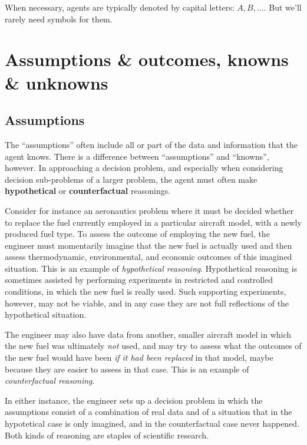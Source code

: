 \documentclass[
  a4paper,
  DIV=11,
  numbers=noendperiod,
  oneside]{scrreprt}
\begin{document}
When necessary, agents are typically denoted by capital letters:
{\(A, B,\dotsc\).} But we'll rarely need symbols for them.

\hypertarget{assumptions-outcomes-knowns-unknowns}{%
\section{Assumptions \& outcomes, knowns \&
unknowns}\label{assumptions-outcomes-knowns-unknowns}}

\hypertarget{assumptions}{%
\subsection{Assumptions}\label{assumptions}}

The ``assumptions'' often include all or part of the data and
information that the agent knows. There is a difference between
``assumptions'' and ``knowns'', however. In approaching a decision
problem, and especially when considering decision sub-problems of a
larger problem, the agent must often make \textbf{hypothetical} or
\textbf{counterfactual} reasonings.

Consider for instance an aeronautics problem where it must be decided
whether to replace the fuel currently employed in a particular aircraft
model, with a newly produced fuel type. To assess the outcome of
employing the new fuel, the engineer must momentarily imagine that the
new fuel is actually used and then assess thermodynamic, environmental,
and economic outcomes of this imagined situation. This is an example of
\emph{hypothetical reasoning}. Hypothetical reasoning is sometimes
assisted by performing experiments in restricted and controlled
conditions, in which the new fuel is really used. Such supporting
experiments, however, may not be viable, and in any case they are not
full reflections of the hypothetical situation.

The engineer may also have data from another, smaller aircraft model in
which the new fuel was ultimately \emph{not} used, and may try to assess
what the outcomes of the new fuel would have been \emph{if it had been
replaced} in that model, maybe because they are easier to assess in that
case. This is an example of \emph{counterfactual reasoning}.

In either instance, the engineer sets up a decision problem in which the
assumptions consist of a combination of real data and of a situation
that in the hypotetical case is only imagined, and in the counterfactual
case never happened. Both kinds of reasoning are staples of scientific
research.
\end{document}
